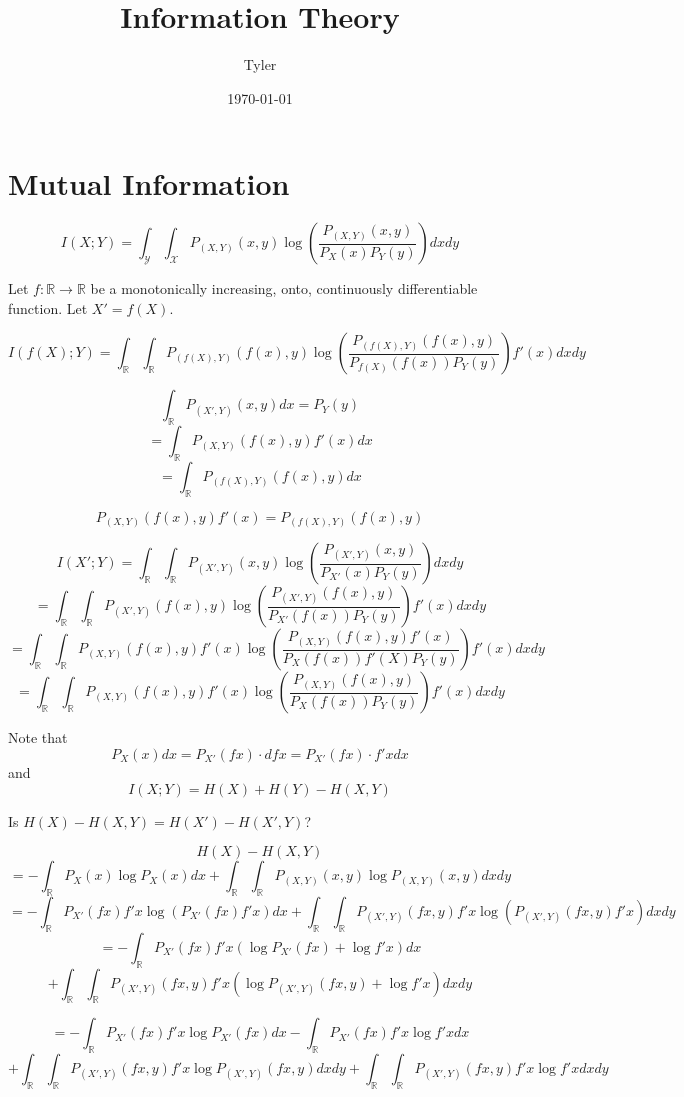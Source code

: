\documentclass[12pt]{article}
\title{Information Theory}
\author{Tyler}
\date{\today}
\newcommand{\R}{\mathbb{R}}
\begin{document}
\maketitle

\section*{Mutual Information}

$$I(X;Y) = \int_{\mathcal{Y}}\int_{\mathcal{X}}P_{(X,Y)}(x,y)\log\left(\frac{P_{(X,Y)}(x,y)}{P_X(x)P_Y(y)}\right)dxdy$$

Let $f : \R \to \R$ be a monotonically increasing, onto, continuously differentiable function. Let $X' = f(X)$.

$$I(f(X);Y) = \int_{\R}\int_{\R}P_{(f(X),Y)}(f(x),y)\log\left(\frac{P_{(f(X),Y)}(f(x),y)}{P_{f(X)}(f(x))P_Y(y)}\right)f'(x)dxdy$$


$$\int_{\R}P_{(X',Y)}(x,y)dx = P_Y(y)$$
$$= \int_{\R}P_{(X,Y)}(f(x),y)f'(x)dx$$
$$= \int_{\R}P_{(f(X),Y)}(f(x),y)dx$$

$$P_{(X,Y)}(f(x),y)f'(x) = P_{(f(X),Y)}(f(x),y)$$

$$I(X';Y) = \int_{\R}\int_{\R}P_{(X',Y)}(x,y)\log\left(\frac{P_{(X',Y)}(x,y)}{P_{X'}(x)P_Y(y)}\right)dxdy$$
$$= \int_{\R}\int_{\R}P_{(X',Y)}(f(x),y)\log\left(\frac{P_{(X',Y)}(f(x),y)}{P_{X'}(f(x))P_Y(y)}\right)f'(x)dxdy$$
$$= \int_{\R}\int_{\R}P_{(X,Y)}(f(x),y)f'(x)\log\left(\frac{P_{(X,Y)}(f(x),y)f'(x)}{P_{X}(f(x))f'(X)P_Y(y)}\right)f'(x)dxdy$$
$$= \int_{\R}\int_{\R}P_{(X,Y)}(f(x),y)f'(x)\log\left(\frac{P_{(X,Y)}(f(x),y)}{P_{X}(f(x))P_Y(y)}\right)f'(x)dxdy$$

\newpage

Note that
$$P_X(x)dx = P_{X'}(fx)\cdot dfx = P_{X'}(fx)\cdot f'x dx$$
and
$$I(X;Y) = H(X) + H(Y) - H(X,Y)$$

Is $H(X) - H(X,Y) = H(X') - H(X',Y)$?

$$H(X) - H(X,Y)$$
$$= -\int_{\R}P_X(x)\log P_X(x) dx + \int_{\R}\int_{\R}P_{(X,Y)}(x,y)\log P_{(X,Y)}(x,y)dxdy$$
$$= -\int_{\R}P_{X'}(fx) f'x \log (P_{X'}(fx) f'x) dx + \int_{\R}\int_{\R}P_{(X',Y)}(fx,y)f'x\log (P_{(X',Y)}(fx,y)f'x)dxdy$$
$$= -\int_{\R}P_{X'}(fx) f'x (\log P_{X'}(fx) + \log f'x) dx $$
$$+ \int_{\R}\int_{\R}P_{(X',Y)}(fx,y)f'x(\log P_{(X',Y)}(fx,y) + \log f'x)dxdy$$

$$= -\int_{\R}P_{X'}(fx) f'x \log P_{X'}(fx)  dx -\int_{\R}P_{X'}(fx) f'x \log f'x dx $$
$$+ \int_{\R}\int_{\R}P_{(X',Y)}(fx,y)f'x\log P_{(X',Y)}(fx,y)dxdy + \int_{\R}\int_{\R}P_{(X',Y)}(fx,y)f'x \log f'x dxdy$$
\end{document}
